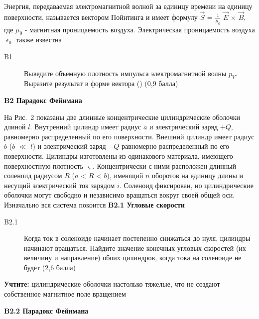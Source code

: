 \documentclass[a4paper, 14pt]{article}
\begin{document}
    \vspace{\baselineskip}
    Энергия, передаваемая электромагнитной волной за единицу времени на единицу поверхности, называется вектором
    Пойнтинга и имеет формулу $\vec{S}$ = $\frac{1}{\mu_0}$ $\vec{E}$ $\times$ $\vec{B}$, где $\mu_0$ - магнитная
    проницаемость воздуха.
    Электрическая проницаемость воздуха ${\upvarepsilon_0}$ также известна
    
    \begin{description}
        \item [B1] Выведите объемную плотность импульса электромагнитной
        волны $p_V$.
        Выразите результат в форме вектора () (0,9 балла)
    \end{description}
    
    \vspace{\baselineskip}
    \textbf{B2 Парадокс Фейнмана}
    
    \vspace{\baselineskip}
    На Рис.~2 показаны две длинные концентрические цилиндрические оболочки длиной $l$.
    Внутренний цилиндр имеет
    радиус $a$ и электрический заряд $+Q$, равномерно распределенный по его поверхности.
    Внешний цилиндр имеет радиус $b$ ($b$ $\ll$ $l$)
    и электрический заряд $-Q$ равномерно распределенный по его поверхности.
    Цилиндры изготовлены из одинакового материала, имеющего поверхностную плотность $\upvarsigma$.
    Концентрически с ними расположен длинный соленоид радиусом $R$ ($a$ < $R$ < $b$), имеющий $n$ оборотов на единицу
    длины и несущий электрический ток зарядом $i$.
    Соленоид фиксирован, но цилиндрические оболочки могут свободно и независимо вращаться вокруг своей общей оси.
    Изначально вся система покоится
    \newpage
    \vspace{\baselineskip}
    \textbf{B2.1 Угловые скорости}
    
    \begin{description}
        \item [B2.1] Когда ток в соленоиде начинает постепенно снижаться до нуля, цилиндры начинают вращаться.
        Найдите значение конечных угловых скоростей (их величину и направление) обоих цилиндров, когда тока на
        соленоиде не будет (2,6 балла)
    \end{description}
    
    \textbf{Учтите:} цилиндрические оболочки настолько тяжелые, что не создают собственное магнитное поле вращением
    
    \vspace{\baselineskip}
    \textbf{B2.2 Парадокс Фейнмана}
    
\end{document}
